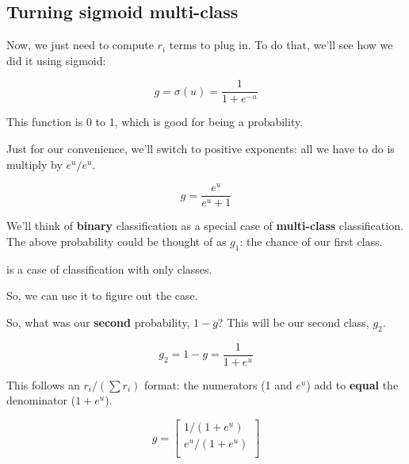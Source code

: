     \subsection{Turning sigmoid multi-class}
    
        Now, we just need to compute $r_i$ terms to plug in. To do that, we'll see how we did it using sigmoid:
        
        \begin{equation}
            g= \sigma(u) = \frac{1}{1+e^{-u}}
        \end{equation}
        
        This function is 0 to 1, which is good for being a probability. 
        
        Just for our convenience, we'll switch to positive exponents: all we have to do is multiply by $e^u/e^u$.
        
        \begin{equation}
            g = \frac{e^u}{e^u+1}
        \end{equation}
        
        We'll think of \textbf{binary} classification as a special case of \textbf{multi-class} classification. The above probability could be thought of as $g_1$: the chance of our first class.\\
        
        \begin{concept}
             is a  case of  classification with only  classes. 
            
            So, we can use it to figure out the  case.
        \end{concept}
        
        So, what was our \textbf{second} probability, $1-g$? This will be our second class, $g_2$.
        
        \begin{equation}
            g_2 = 1-g= \frac{1}{1+e^{u}}
        \end{equation}
        
        This follows an $r_i/(\sum r_i)$ format: the numerators (1 and $e^u$) add to \textbf{equal} the denominator ($1+e^u$).
        
        \begin{equation}
            g = 
            \begin{bmatrix}
                1/(1+e^u)  \\
                e^u/(1+e^u)  \\
            \end{bmatrix}
        \end{equation}
        

